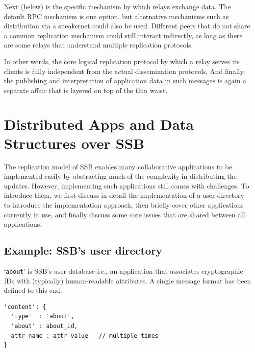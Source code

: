 \documentclass[9pt,sigconf]{acmart}
\begin{document}
Next (below) is the specific mechanism by which relays exchange data. The default RPC mechanism is one option, but alternative mechanisms such as distribution via a sneakernet could also be used. Different peers that do not share a common replication mechanism could still interact indirectly, as long as there are some relays that understand multiple replication protocols.

In other words, the core logical replication protocol by which a relay serves its clients is fully independent from the actual dissemination protocols. And finally, the publishing and interpretation of application data in such messages is again a separate affair that is layered on top of the thin waist.

\section{Distributed Apps and Data Structures over SSB}
\label{sect:apps}


The replication model of SSB enables many collaborative applications to be implemented easily by abstracting much of the complexity in distributing the updates. However, implementing such applications still comes with challenges. To introduce them, we first discuss in detail the implementation of a user directory to introduce the implementation approach, then briefly cover other applications currently in use, and finally discuss some core issues that are shared between all applications.

\subsection{Example: SSB's user directory}
\label{ssect:about}

`{\small\tt about}' is SSB's user database i.e., an application that
associates cryptographic IDs with (typically) human-readable
attributes. A single message format has been defined to this end:
{\small\begin{verbatim}
'content': {
  'type'  : 'about',
  'about' : about_id,
  attr_name : attr_value   // multiple times
}
\end{verbatim}}
\end{document}
